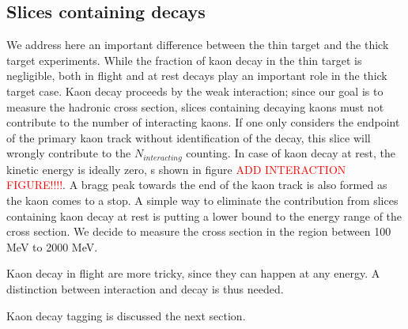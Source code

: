 


\subsection{Slices containing decays}
We address here an important difference between the thin target and the thick target experiments. While the fraction of kaon decay in the thin target is negligible, both in flight and at rest decays play an important role in the thick target case. 
Kaon decay proceeds by the weak interaction; since our goal is to measure the hadronic cross section, slices containing decaying kaons must not contribute to the number of interacting kaons. If one only considers the endpoint of the primary kaon track without identification of the decay, this slice will  wrongly contribute to the $N_{interacting}$ counting. 
In case of kaon decay at rest, the kinetic energy is ideally zero, s shown in figure \textcolor{red}{ADD INTERACTION FIGURE!!!!}. A bragg peak towards the end of the kaon track is also formed as the kaon comes to a stop. A simple way to eliminate the contribution from slices containing kaon decay at rest is putting a lower bound to the energy range of the cross section. We decide to measure the cross section in the region between 100 MeV to 2000 MeV.

Kaon decay in flight are more tricky, since they can happen at any energy. A distinction between interaction and decay is thus needed. 





 Kaon decay tagging is discussed the next section. 




